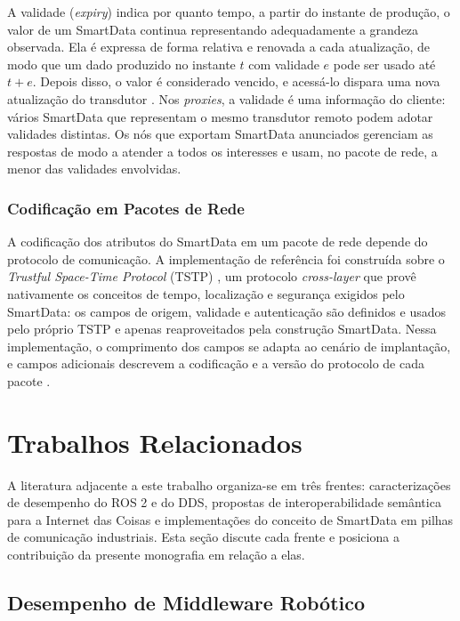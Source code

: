 \documentclass[
    12pt,
    oneside,
    a4paper,
    chapter=TITLE,
    section=TITLE,
    english,
    brazil
]{abntex2}
\begin{document}
A validade (\textit{expiry}) indica por quanto tempo, a partir do
instante de produção, o valor de um SmartData continua representando
adequadamente a grandeza observada. Ela é expressa de forma relativa e
renovada a cada atualização, de modo que um dado produzido no instante
\(t\) com validade \(e\) pode ser usado até \(t + e\). Depois disso, o
valor é considerado vencido, e acessá-lo dispara uma nova atualização do
transdutor \cite{frohlich2018smartdata}. Nos \textit{proxies}, a validade
é uma informação do cliente: vários SmartData que representam o mesmo transdutor
remoto podem adotar validades distintas. Os nós que exportam SmartData
anunciados gerenciam as respostas de modo a atender a todos os interesses
e usam, no pacote de rede, a menor das validades envolvidas.

\subsection{Codificação em Pacotes de Rede}
\label{sec:sd-pacote}
A codificação dos atributos do SmartData em um pacote de rede depende do
protocolo de comunicação. A implementação de referência foi construída
sobre o \textit{Trustful Space-Time Protocol} (TSTP)
\cite{resner2015tstp}, um protocolo \textit{cross-layer} que provê
nativamente os conceitos de tempo, localização e segurança exigidos pelo
SmartData: os campos de origem, validade e autenticação são definidos e
usados pelo próprio TSTP e apenas reaproveitados pela construção
SmartData. Nessa implementação, o comprimento dos campos se adapta ao
cenário de implantação, e campos adicionais descrevem a codificação e a
versão do protocolo de cada pacote \cite{frohlich2018smartdata}.

\chapter{Trabalhos Relacionados}
\label{cap:relacionados}

A literatura adjacente a este trabalho organiza-se em três frentes:
caracterizações de desempenho do ROS 2 e do DDS, propostas de
interoperabilidade semântica para a Internet das Coisas e implementações
do conceito de SmartData em pilhas de comunicação industriais. Esta
seção discute cada frente e posiciona a contribuição da presente
monografia em relação a elas.

\section{Desempenho de Middleware Robótico}
\label{sec:rel-perf}
\end{document}
